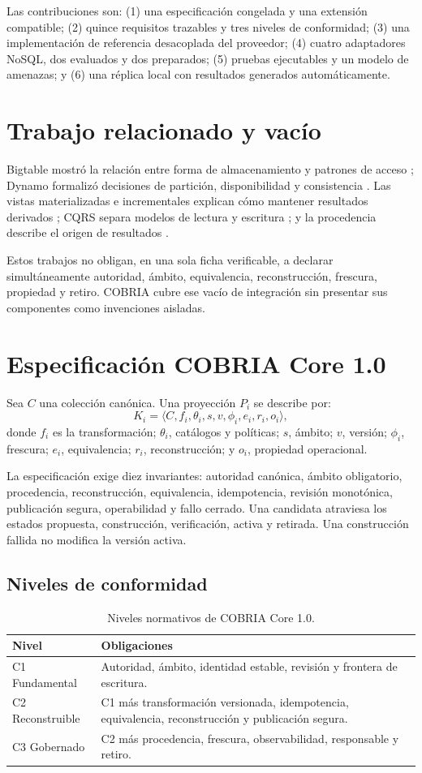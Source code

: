 \documentclass[11pt]{article}
\begin{document}
Las contribuciones son: (1) una especificación congelada y una extensión compatible; (2) quince requisitos trazables y tres niveles de conformidad; (3) una implementación de referencia desacoplada del proveedor; (4) cuatro adaptadores NoSQL, dos evaluados y dos preparados; (5) pruebas ejecutables y un modelo de amenazas; y (6) una réplica local con resultados generados automáticamente.

\section{Trabajo relacionado y vacío}
Bigtable mostró la relación entre forma de almacenamiento y patrones de acceso \cite{chang}; Dynamo formalizó decisiones de partición, disponibilidad y consistencia \cite{dynamo}. Las vistas materializadas e incrementales explican cómo mantener resultados derivados \cite{gupta}; CQRS separa modelos de lectura y escritura \cite{fowler}; y la procedencia describe el origen de resultados \cite{buneman}.

Estos trabajos no obligan, en una sola ficha verificable, a declarar simultáneamente autoridad, ámbito, equivalencia, reconstrucción, frescura, propiedad y retiro. COBRIA cubre ese vacío de integración sin presentar sus componentes como invenciones aisladas.

\section{Especificación COBRIA Core 1.0}
Sea $C$ una colección canónica. Una proyección $P_i$ se describe por:
\[
K_i=\langle C,f_i,\theta_i,s,v,\phi_i,e_i,r_i,o_i\rangle,
\]
donde $f_i$ es la transformación; $\theta_i$, catálogos y políticas; $s$, ámbito; $v$, versión; $\phi_i$, frescura; $e_i$, equivalencia; $r_i$, reconstrucción; y $o_i$, propiedad operacional.

La especificación exige diez invariantes: autoridad canónica, ámbito obligatorio, procedencia, reconstrucción, equivalencia, idempotencia, revisión monotónica, publicación segura, operabilidad y fallo cerrado. Una candidata atraviesa los estados propuesta, construcción, verificación, activa y retirada. Una construcción fallida no modifica la versión activa.

\subsection{Niveles de conformidad}
\begin{table}[h]
\centering
\caption{Niveles normativos de COBRIA Core 1.0.}
\begin{tabularx}{\textwidth}{lX}
\toprule Nivel & Obligaciones \\ \midrule
C1 Fundamental & Autoridad, ámbito, identidad estable, revisión y frontera de escritura.\\
C2 Reconstruible & C1 más transformación versionada, idempotencia, equivalencia, reconstrucción y publicación segura.\\
C3 Gobernado & C2 más procedencia, frescura, observabilidad, responsable y retiro.\\ \bottomrule
\end{tabularx}
\end{table}
\end{document}
